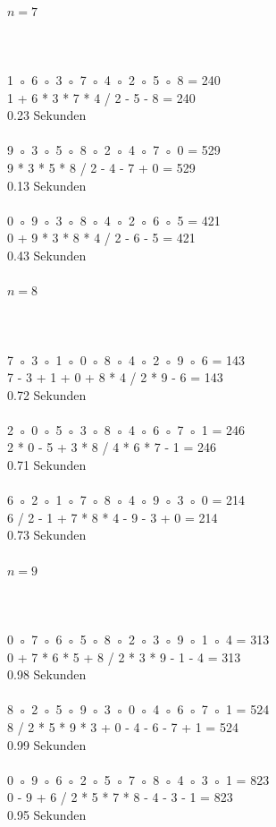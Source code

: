 \documentclass[a4paper,10pt,ngerman]{scrartcl}
\begin{document}
\paragraph{$n=7$} \hrulefill
\\
\\
1 ◦ 6 ◦ 3 ◦ 7 ◦ 4 ◦ 2 ◦ 5 ◦ 8 = 240\\
1 + 6 * 3 * 7 * 4 / 2 - 5 - 8 = 240\\
0.23 Sekunden\\
\\
9 ◦ 3 ◦ 5 ◦ 8 ◦ 2 ◦ 4 ◦ 7 ◦ 0 = 529\\
9 * 3 * 5 * 8 / 2 - 4 - 7 + 0 = 529\\
0.13 Sekunden\\
\\
0 ◦ 9 ◦ 3 ◦ 8 ◦ 4 ◦ 2 ◦ 6 ◦ 5 = 421\\
0 + 9 * 3 * 8 * 4 / 2 - 6 - 5 = 421\\
0.43 Sekunden\\
\paragraph{$n=8$} \hrulefill
\\
\\
7 ◦ 3 ◦ 1 ◦ 0 ◦ 8 ◦ 4 ◦ 2 ◦ 9 ◦ 6 = 143\\
7 - 3 + 1 + 0 + 8 * 4 / 2 * 9 - 6 = 143\\
0.72 Sekunden\\
\\
2 ◦ 0 ◦ 5 ◦ 3 ◦ 8 ◦ 4 ◦ 6 ◦ 7 ◦ 1 = 246\\
2 * 0 - 5 + 3 * 8 / 4 * 6 * 7 - 1 = 246\\
0.71 Sekunden\\
\\
6 ◦ 2 ◦ 1 ◦ 7 ◦ 8 ◦ 4 ◦ 9 ◦ 3 ◦ 0 = 214\\
6 / 2 - 1 + 7 * 8 * 4 - 9 - 3 + 0 = 214\\
0.73 Sekunden\\
\paragraph{$n=9$} \hrulefill
\\
\\
0 ◦ 7 ◦ 6 ◦ 5 ◦ 8 ◦ 2 ◦ 3 ◦ 9 ◦ 1 ◦ 4 = 313\\
0 + 7 * 6 * 5 + 8 / 2 * 3 * 9 - 1 - 4 = 313\\
0.98 Sekunden\\
\\
8 ◦ 2 ◦ 5 ◦ 9 ◦ 3 ◦ 0 ◦ 4 ◦ 6 ◦ 7 ◦ 1 = 524\\
8 / 2 * 5 * 9 * 3 + 0 - 4 - 6 - 7 + 1 = 524\\
0.99 Sekunden\\
\\
0 ◦ 9 ◦ 6 ◦ 2 ◦ 5 ◦ 7 ◦ 8 ◦ 4 ◦ 3 ◦ 1 = 823\\
0 - 9 + 6 / 2 * 5 * 7 * 8 - 4 - 3 - 1 = 823\\
0.95 Sekunden\\
\end{document}
